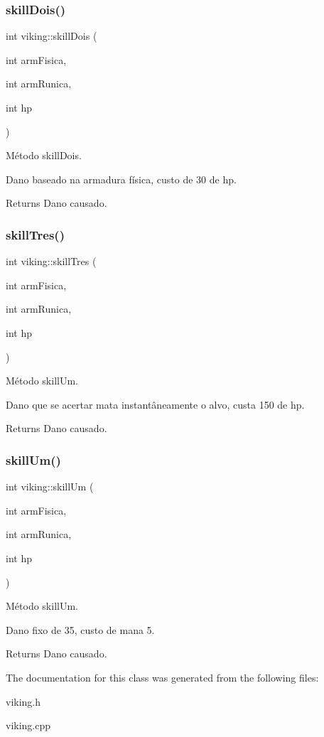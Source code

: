 \subsubsection{\texorpdfstring{skill\+Dois()}{skillDois()}}
{\footnotesize\ttfamily int viking\+::skill\+Dois (\begin{DoxyParamCaption}\item[{int}]{arm\+Fisica,  }\item[{int}]{arm\+Runica,  }\item[{int}]{hp }\end{DoxyParamCaption})}



Método skill\+Dois. 

Dano baseado na armadura física, custo de 30 de hp. \begin{DoxyReturn}{Returns}
Dano causado. 
\end{DoxyReturn}
\mbox{\label{classviking_a68c634c68c727ebd2638965b6d393f42}} 
\subsubsection{\texorpdfstring{skill\+Tres()}{skillTres()}}
{\footnotesize\ttfamily int viking\+::skill\+Tres (\begin{DoxyParamCaption}\item[{int}]{arm\+Fisica,  }\item[{int}]{arm\+Runica,  }\item[{int}]{hp }\end{DoxyParamCaption})}



Método skill\+Um. 

Dano que se acertar mata instantâneamente o alvo, custa 150 de hp. \begin{DoxyReturn}{Returns}
Dano causado. 
\end{DoxyReturn}
\mbox{\label{classviking_a433998767ad855cbfa152c1b0f32363e}} 
\subsubsection{\texorpdfstring{skill\+Um()}{skillUm()}}
{\footnotesize\ttfamily int viking\+::skill\+Um (\begin{DoxyParamCaption}\item[{int}]{arm\+Fisica,  }\item[{int}]{arm\+Runica,  }\item[{int}]{hp }\end{DoxyParamCaption})}



Método skill\+Um. 

Dano fixo de 35, custo de mana 5. \begin{DoxyReturn}{Returns}
Dano causado. 
\end{DoxyReturn}


The documentation for this class was generated from the following files\+:\begin{DoxyCompactItemize}
\item 
viking.\+h\item 
viking.\+cpp\end{DoxyCompactItemize}
